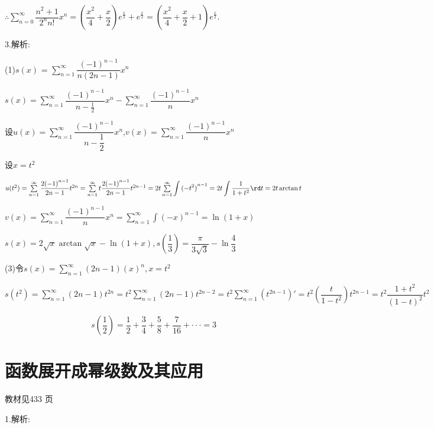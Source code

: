 $\therefore \sum\limits_{n = 0}^\infty  {\dfrac{{{n^2} + 1}}{{{2^n}n!}}{x^n}}  = (\dfrac{{{x^2}}}{4} + \dfrac{x}{2}){e^{\frac{x}{2}}} + {e^{\frac{x}{2}}} = (\dfrac{{{x^2}}}{4} + \dfrac{x}{2} + 1){e^{\frac{x}{2}}}.$

3.解析:

(1)$s(x){\text{ = }}\sum\limits_{n = 1}^\infty  {\dfrac{{{{( - 1)}^{n - 1}}}}{{n\left( {2n - 1} \right)}}} {x^n} $

$s(x) = \sum\limits_{n = 1}^\infty  {\dfrac{{{{( - 1)}^{n - 1}}}}{{n - \frac{1}{2}}}} {x^n} - \sum\limits_{n = 1}^\infty  {\dfrac{{{{( - 1)}^{n - 1}}}}{n}} {x^n}$

设$u(x) = \sum\limits_{n = 1}^\infty  {\dfrac{{{{( - 1)}^{n - 1}}}}{{n - \dfrac{1}{2}}}} {x^n}$,$v(x) = \sum\limits_{n = 1}^\infty  {\dfrac{{{{( - 1)}^{n - 1}}}}{n}} {x^n}$

设$x = {t^2}$

$u({t^2}) = \sum\limits_{n = 1}^\infty  {\dfrac{{2{{( - 1)}^{n - 1}}}}{{2n - 1}}} {t^{2n}} = \sum\limits_{n = 1}^\infty  {t\dfrac{{2{{( - 1)}^{n - 1}}}}{{2n - 1}}} {t^{2n - 1}} = 2t\sum\limits_{n = 1}^\infty  {\displaystyle\int {{{( - {t^2})}^{n - 1}}} }  = 2t\displaystyle\int {\dfrac{1}{{1 + {t^2}}}}\rd t  = 2t\arctan t$

$v(x) = \sum\limits_{n = 1}^\infty  {\dfrac{{{{( - 1)}^{n - 1}}}}{n}} {x^n} = \sum\limits_{n = 1}^\infty  {\displaystyle\int {{{\left( { - x} \right)}^{n - 1}}} }  = \ln (1 + x)$

$s(x) = 2\sqrt x \arctan \sqrt x  - \ln (1 + x),s(\dfrac{1}{3}) = \dfrac{\pi }{{3\sqrt 3 }} - \ln \dfrac{4}{3}$

(3)令$s(x) = \sum\limits_{n = 1}^\infty  {(2n - 1)} {(x)^n},x = {t^2}$

$s({t^2}) = \sum\limits_{n = 1}^\infty  {(2n - 1)} {t^{2n}} = {t^2}\sum\limits_{n = 1}^\infty  {(2n - 1)} {t^{2n - 2}} = {t^2}\sum\limits_{n = 1}^\infty  {{{({t^{2n - 1}})}'}}  = {t^2}(\dfrac{t}{{1 - {t^2}}}){t^{2n - 1}} = {t^2}\dfrac{{1 + {t^2}}}{{{{(1 - t)}^2}}}{t^2}$

\[s(\dfrac{1}{2}) = \dfrac{1}{2} + \dfrac{3}{4} + \dfrac{5}{8} + \dfrac{7}{{16}} +  \cdot  \cdot  \cdot  = 3\]

\section{函数展开成幂级数及其应用}
\begin{flushright}
  \color{zhanqing!80}
   教材见433 页 %
\end{flushright}
1.解析:

